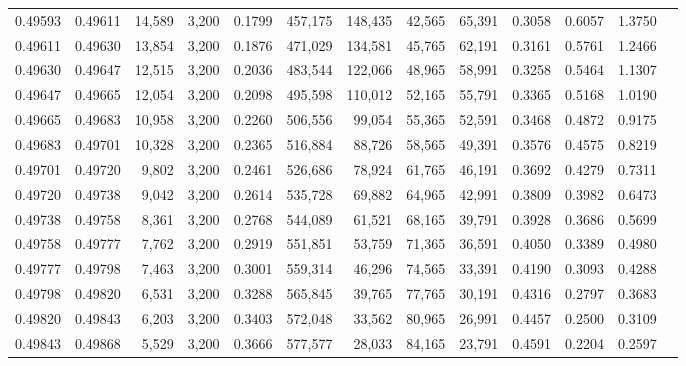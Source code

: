 \begin{tabular}{rrrrrrrrrrrrr}
0.49593 & 0.49611 & 14,589 & 3,200 &                                     0.1799 & 457,175 & 148,435 &  42,565 &  65,391 & 0.3058 & 0.6057 & 1.3750 \\
0.49611 & 0.49630 & 13,854 & 3,200 &                                     0.1876 & 471,029 & 134,581 &  45,765 &  62,191 & 0.3161 & 0.5761 & 1.2466 \\
0.49630 & 0.49647 & 12,515 & 3,200 &                                     0.2036 & 483,544 & 122,066 &  48,965 &  58,991 & 0.3258 & 0.5464 & 1.1307 \\
0.49647 & 0.49665 & 12,054 & 3,200 &                                     0.2098 & 495,598 & 110,012 &  52,165 &  55,791 & 0.3365 & 0.5168 & 1.0190 \\
0.49665 & 0.49683 & 10,958 & 3,200 &                                     0.2260 & 506,556 &  99,054 &  55,365 &  52,591 & 0.3468 & 0.4872 & 0.9175 \\
0.49683 & 0.49701 & 10,328 & 3,200 &                                     0.2365 & 516,884 &  88,726 &  58,565 &  49,391 & 0.3576 & 0.4575 & 0.8219 \\
0.49701 & 0.49720 &  9,802 & 3,200 &                                     0.2461 & 526,686 &  78,924 &  61,765 &  46,191 & 0.3692 & 0.4279 & 0.7311 \\
0.49720 & 0.49738 &  9,042 & 3,200 &                                     0.2614 & 535,728 &  69,882 &  64,965 &  42,991 & 0.3809 & 0.3982 & 0.6473 \\
0.49738 & 0.49758 &  8,361 & 3,200 &                                     0.2768 & 544,089 &  61,521 &  68,165 &  39,791 & 0.3928 & 0.3686 & 0.5699 \\
0.49758 & 0.49777 &  7,762 & 3,200 &                                     0.2919 & 551,851 &  53,759 &  71,365 &  36,591 & 0.4050 & 0.3389 & 0.4980 \\
0.49777 & 0.49798 &  7,463 & 3,200 &                                     0.3001 & 559,314 &  46,296 &  74,565 &  33,391 & 0.4190 & 0.3093 & 0.4288 \\
0.49798 & 0.49820 &  6,531 & 3,200 &                                     0.3288 & 565,845 &  39,765 &  77,765 &  30,191 & 0.4316 & 0.2797 & 0.3683 \\
0.49820 & 0.49843 &  6,203 & 3,200 &                                     0.3403 & 572,048 &  33,562 &  80,965 &  26,991 & 0.4457 & 0.2500 & 0.3109 \\
0.49843 & 0.49868 &  5,529 & 3,200 &                                     0.3666 & 577,577 &  28,033 &  84,165 &  23,791 & 0.4591 & 0.2204 & 0.2597 \\

\end{tabular}
